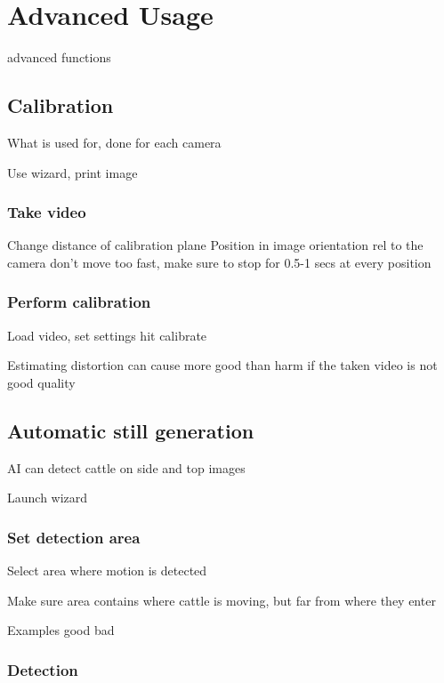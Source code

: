 \documentclass[10pt,a4paper,oneside]{report}             %
\begin{document}
\chapter{Advanced Usage}

advanced functions

\section{Calibration}

What is used for, done for each camera

Use wizard, print image

\subsection{Take video}

Change distance of calibration plane
Position in image
orientation rel to the camera
don't move too fast, make sure to stop for 0.5-1 secs at every position

\subsection{Perform calibration}

Load video, set settings hit calibrate

Estimating distortion can cause more good than harm if the taken video is not good quality

\section{Automatic still generation}

AI can detect cattle on side and top images

Launch wizard

\subsection{Set detection area}

Select area where motion is detected

Make sure area contains where cattle is moving, but far from where they enter

Examples good bad

\subsection{Detection}
\end{document}
